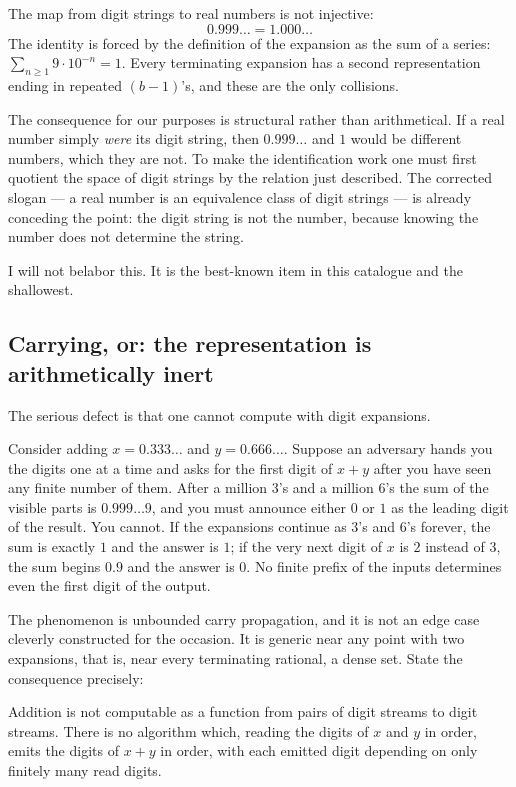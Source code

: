 \documentclass{essay}
\begin{document}
The map from digit strings to real numbers is not injective:
\[
  0.999\ldots = 1.000\ldots
\]
The identity is forced by the definition of the expansion as the sum of a
series: $\sum_{n\ge1} 9 \cdot 10^{-n} = 1$. Every terminating expansion has a
second representation ending in repeated $(b-1)$'s, and these are the only
collisions.

The consequence for our purposes is structural rather than arithmetical. If a
real number simply \emph{were} its digit string, then $0.999\ldots$ and $1$
would be different numbers, which they are not. To make the identification work
one must first quotient the space of digit strings by the relation just
described. The corrected slogan --- a real number is an equivalence class of
digit strings --- is already conceding the point: the digit string is not the
number, because knowing the number does not determine the string.

I will not belabor this. It is the best-known item in this catalogue and the
shallowest.

\subsection{Carrying, or: the representation is arithmetically inert}

The serious defect is that one cannot compute with digit expansions.

Consider adding $x = 0.333\ldots$ and $y = 0.666\ldots$. Suppose an adversary
hands you the digits one at a time and asks for the first digit of $x+y$ after
you have seen any finite number of them. After a million $3$'s and a million
$6$'s the sum of the visible parts is $0.999\ldots9$, and you must announce
either $0$ or $1$ as the leading digit of the result. You cannot. If the
expansions continue as $3$'s and $6$'s forever, the sum is exactly $1$ and the
answer is $1$; if the very next digit of $x$ is $2$ instead of $3$, the sum
begins $0.9$ and the answer is $0$. No finite prefix of the inputs determines
even the first digit of the output.

The phenomenon is unbounded carry propagation, and it is not an edge case
cleverly constructed for the occasion. It is generic near any point with two
expansions, that is, near every terminating rational, a dense set. State the
consequence precisely:

\begin{proposition}
Addition is not computable as a function from pairs of digit streams to digit
streams. There is no algorithm which, reading the digits of $x$ and $y$ in
order, emits the digits of $x+y$ in order, with each emitted digit depending on
only finitely many read digits.
\end{proposition}
\end{document}
